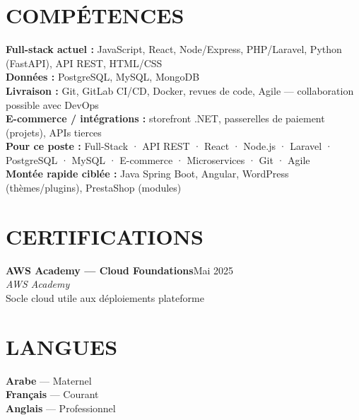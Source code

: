 \documentclass[10pt,a4paper]{article}
\newcommand{\TargetKeywords}{Full-Stack · API REST · React · Node.js · Laravel · PostgreSQL · MySQL · E-commerce · Microservices · Git · Agile}
\newcommand{\cert}[4]{%
  \textbf{\color{primary}\small #1}\hfill{\color{muted}\scriptsize #3}\\[-1pt]
  {\color{accent}\small\textit{#2}}\\[0pt]
  {\color{muted}\scriptsize #4}\\[4pt]
}
\begin{document}
\section{COMPÉTENCES}
{\small
\textbf{\color{primary}Full-stack actuel :} JavaScript, React, Node/Express, PHP/Laravel, Python (FastAPI), API REST, HTML/CSS\\[2pt]
\textbf{\color{primary}Données :} PostgreSQL, MySQL, MongoDB\\[2pt]
\textbf{\color{primary}Livraison :} Git, GitLab CI/CD, Docker, revues de code, Agile --- collaboration possible avec DevOps\\[2pt]
\textbf{\color{primary}E-commerce / intégrations :} storefront .NET, passerelles de paiement (projets), APIs tierces\\[2pt]
\textbf{\color{primary}Pour ce poste :} \TargetKeywords\\[2pt]
\textbf{\color{primary}Montée rapide ciblée :} Java Spring Boot, Angular, WordPress (thèmes/plugins), PrestaShop (modules)
}

\vspace{2pt}
\begin{minipage}[t]{0.65\textwidth}
\section{CERTIFICATIONS}
\cert{AWS Academy — Cloud Foundations}{AWS Academy}{Mai 2025}{Socle cloud utile aux déploiements plateforme}
\end{minipage}%
\hfill
\begin{minipage}[t]{0.32\textwidth}
\section{LANGUES}
{\small\textbf{Arabe} — Maternel}\\[2pt]
{\small\textbf{Français} — Courant}\\[2pt]
{\small\textbf{Anglais} — Professionnel}
\end{minipage}
\end{document}
